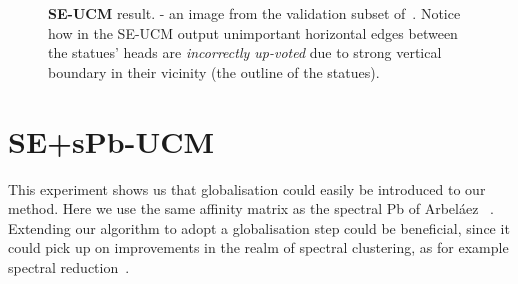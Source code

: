 \begin{figure}[ht!]
\centering
{}
\caption[SE-UCM drawback - ``bleeding'' of strong edges towards unimportant ones]{{\bf SE-UCM} result. \protect{} - an image from the validation subset of~\cite{BSDS500resources}. Notice how in the SE-UCM output \protect{} unimportant horizontal edges between the statues' heads are {\it incorrectly %
up-voted} due to strong vertical boundary in their vicinity (the outline of the statues).}
\label{fig:SE-UCM-tikis-bleeding}
\end{figure}

\section{SE+sPb-UCM}
This experiment shows us that globalisation could easily be introduced to our method. Here we use the same affinity matrix as the spectral Pb of Arbel\'aez \etal~\cite{Arbelaez11}. Extending our algorithm to adopt a globalisation step could be beneficial, since it could pick up on improvements in the realm of spectral clustering, as for example spectral reduction~\cite{Galasso14}. %

